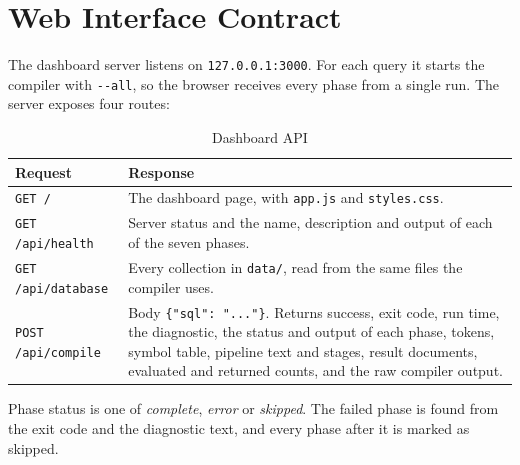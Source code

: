 \documentclass[12pt,a4paper]{report}
\newcommand{\codeus}{\textunderscore\allowbreak}
\DeclareRobustCommand{\code}[1]{\texttt{\let\_\codeus #1}}
\begin{document}
\section{Web Interface Contract}
The dashboard server listens on \code{127.0.0.1:3000}. For each query it starts the compiler with \code{-{}-all}, so the browser receives every phase from a single run. The server exposes four routes:
\begin{table}[H]
\centering\small
\begin{tabularx}{\linewidth}{|P{3.6cm}|L|}
\hline
\textbf{Request} & \textbf{Response} \\ \hline
\code{GET /} & The dashboard page, with \code{app.js} and \code{styles.css}. \\ \hline
\code{GET /api/health} & Server status and the name, description and output of each of the seven phases. \\ \hline
\code{GET /api/database} & Every collection in \code{data/}, read from the same files the compiler uses. \\ \hline
\code{POST /api/compile} & Body \code{\{"sql": "..."\}}. Returns success, exit code, run time, the diagnostic, the status and output of each phase, tokens, symbol table, pipeline text and stages, result documents, evaluated and returned counts, and the raw compiler output. \\ \hline
\end{tabularx}
\caption{Dashboard API}
\end{table}
Phase status is one of \textit{complete}, \textit{error} or \textit{skipped}. The failed phase is found from the exit code and the diagnostic text, and every phase after it is marked as skipped.

\end{document}
